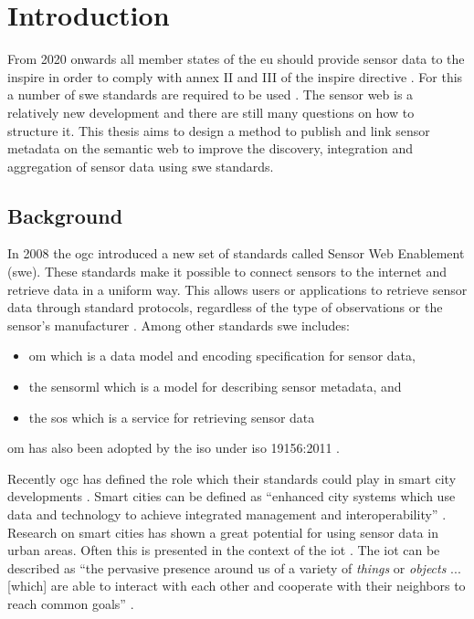 

\chapter{Introduction}
\label{chap:introduction}
From 2020 onwards all member states of the \ac{eu} should provide sensor data to the \ac{inspire} in order to comply with annex II and III of the \ac{inspire} directive \citep{SDI:INSPIRE5}. For this a number of \ac{swe} standards are required to be used \citep{SDI:INSPIRE2}. The sensor web is a relatively new development and there are still many questions on how to structure it. This thesis aims to design a method to publish and link sensor metadata on the semantic web to improve the discovery, integration and aggregation of sensor data using \ac{swe} standards.

\section{Background}
In 2008 the \ac{ogc} introduced a new set of standards called Sensor Web Enablement (\ac{swe}). These standards make it possible to connect sensors to the internet and retrieve data in a uniform way. This allows users or applications to retrieve sensor data through standard protocols, regardless of the type of observations or the sensor's manufacturer \citep{SW:Botts}. Among other standards \ac{swe} includes:
\begin{itemize}
	\item \ac{om} which is a data model and encoding specification for sensor data,
	\item the \ac{sensorml} which is a model for describing sensor metadata, and
	\item the \ac{sos} which is a service for retrieving sensor data \citep{SW:OGC}
\end{itemize}
\ac{om} has also been adopted by the \ac{iso} under \ac{iso} 19156:2011 \citep{SW:ISO}. 

Recently \ac{ogc} has defined the role which their standards could play in smart city developments \citep{SC:OGC}. Smart cities can be defined as \enquote{enhanced city systems which use data and technology to achieve integrated management and interoperability} \citep[p. 18]{SC:Moir}. Research on smart cities has shown a great potential for using sensor data in urban areas. Often this is presented in the context of the \ac{iot} \citep{IOT:Zanelli, SSW:Wang2}. The \ac{iot} can be described as \enquote{the pervasive presence around us of a variety of \textit{things} or \textit{objects} ... [which] are able to interact with each other and cooperate with their neighbors to reach common goals} \cite[p. 2787]{IOT:Atzori}. 

